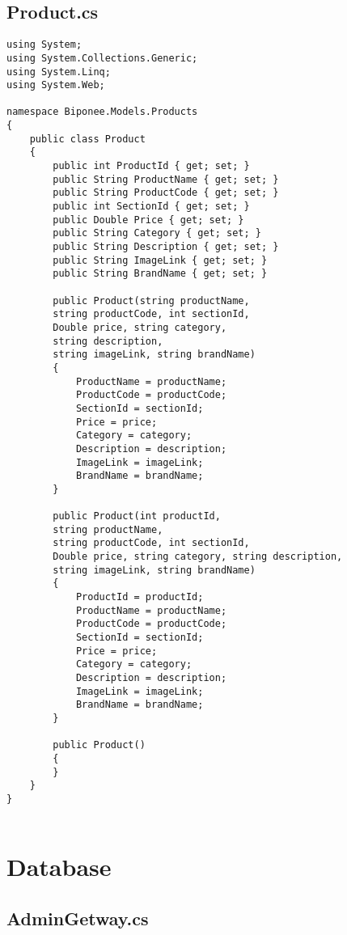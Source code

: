 \subsection{Product.cs}
\begin{lstlisting}
using System;
using System.Collections.Generic;
using System.Linq;
using System.Web;

namespace Biponee.Models.Products
{
    public class Product
    {
        public int ProductId { get; set; }
        public String ProductName { get; set; }
        public String ProductCode { get; set; }
        public int SectionId { get; set; }
        public Double Price { get; set; }
        public String Category { get; set; }
        public String Description { get; set; }
        public String ImageLink { get; set; }
        public String BrandName { get; set; }

        public Product(string productName, 
        string productCode, int sectionId, 
        Double price, string category, 
        string description, 
        string imageLink, string brandName)
        {
            ProductName = productName;
            ProductCode = productCode;
            SectionId = sectionId;
            Price = price;
            Category = category;
            Description = description;
            ImageLink = imageLink;
            BrandName = brandName;
        }

        public Product(int productId,
        string productName, 
        string productCode, int sectionId, 
        Double price, string category, string description, 
        string imageLink, string brandName)
        {
            ProductId = productId;
            ProductName = productName;
            ProductCode = productCode;
            SectionId = sectionId;
            Price = price;
            Category = category;
            Description = description;
            ImageLink = imageLink;
            BrandName = brandName;
        }

        public Product()
        {
        }
    }
}


\end{lstlisting}
\newpage

\section{Database}

\subsection{AdminGetway.cs}

